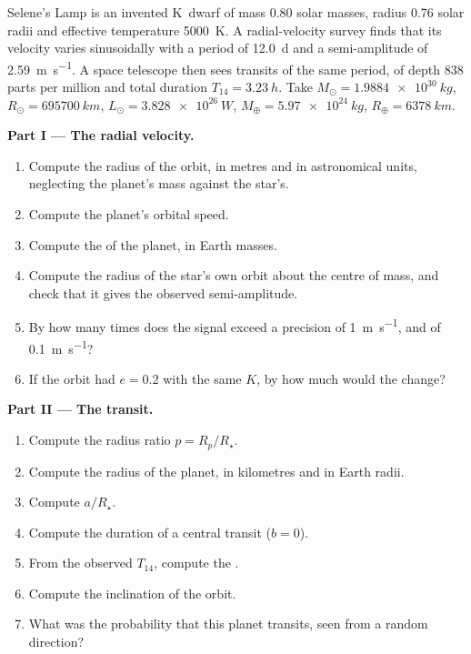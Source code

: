 \begin{problem}
\label{pb:b3:exoplanets:1}
Selene's Lamp is an invented K~dwarf of mass 0.80 solar masses, radius
0.76 solar radii and effective temperature \qty{5000}{K}. A
radial-velocity survey finds that its velocity varies sinusoidally with
a period of \qty{12.0}{d} and a semi-amplitude of \qty{2.59}{m.s^{-1}}. A
space telescope then sees transits of the same period, of depth
\num{838} parts per million and total duration $T_{14} = \qty{3.23}{h}$.
Take $M_\odot = \qty{1.9884e30}{kg}$, $R_\odot = \qty{695700}{km}$,
$L_\odot = \qty{3.828e26}{W}$, $M_\oplus = \qty{5.97e24}{kg}$,
$R_\oplus = \qty{6378}{km}$.

\medskip\noindent\textbf{Part I --- The radial velocity.}
\begin{enumerate}
\item Compute the radius of the orbit, in metres and in astronomical
  units, neglecting the planet's mass against the star's.
\item Compute the planet's orbital speed.
\item Compute the  of the planet, in Earth masses.
\item Compute the radius of the star's own orbit about the centre of
  mass, and check that it gives the observed semi-amplitude.
\item By how many times does the signal exceed a precision of
  \qty{1}{m.s^{-1}}, and of \qty{0.1}{m.s^{-1}}?
\item If the orbit had $e = 0.2$ with the same $K$, by how much would the
   change?
\end{enumerate}

\medskip\noindent\textbf{Part II --- The transit.}
\begin{enumerate}[resume]
\item Compute the radius ratio $p = R_p/R_\star$.
\item Compute the radius of the planet, in kilometres and in Earth radii.
\item Compute $a/R_\star$.
\item Compute the duration of a central transit ($b = 0$).
\item From the observed $T_{14}$, compute the .
\item Compute the inclination of the orbit.
\item What was the probability that this planet transits, seen from a
  random direction?
\end{enumerate}


\end{problem}
